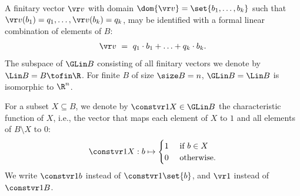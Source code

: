 A finitary vector $\vr v$ with domain $\dom {\vr v} = \set{b_1, \ldots, b_k}$ such that
$\vr v(b_1) = q_1, \ldots, \vr v(b_k) = q_k$, 
may be identified with a formal linear combination of elements 
of $B$:
%
\begin{align} \label{eq:formalsum}
\vr v \ = \ q_1 \cdot b_1 + \ldots + q_k \cdot b_k.  %
\end{align}
%
The subspace of $\GLin B$ consisting of all finitary vectors we denote by $\Lin B = B\tofin\R$.
For finite $B$ of size $\size B = n$, $\GLin B = \Lin B$ is isomorphic to $\R^{n}$.
%

For a subset $X\subseteq B$, we denote by $\constvr 1 X\in\GLin B$ the characteristic function of $X$,
i.e., the vector that maps each element of  $X$ to $1$ and all elements of $B\setminus X$ to $0$:
\[
\constvr 1 X : b \mapsto \begin{cases}
1 & \text{ if } b \in X \\
0 & \text{ otherwise.}
\end{cases} 
\]
We write $\constvr 1 b$ instead of $\constvr 1 {\set{b}}$, and $\vr 1$ instead of $\constvr 1 B$.


%


